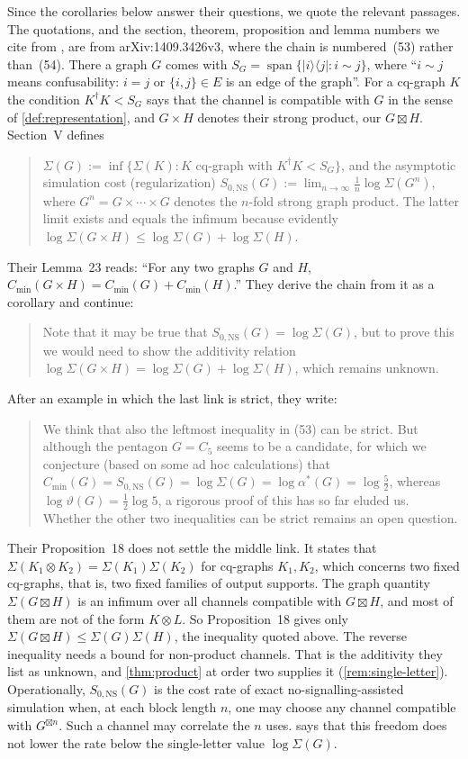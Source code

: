 \documentclass[11pt]{article}
\theoremstyle{definition}
\newcommand{\vt}{\vartheta}
\newcommand{\Cmin}{C_{\min}}
\newcommand{\SNS}{S_{0,\mathrm{NS}}}
\newcommand{\boxt}{\boxtimes}
\newcommand{\ket}[1]{\lvert #1\rangle}
\newcommand{\bra}[1]{\langle #1\rvert}
\begin{document}
Since the corollaries below answer their questions, we quote the relevant
passages.  The quotations, and the section, theorem, proposition and lemma
numbers we cite from \cite{DuanWinter2016}, are from arXiv:1409.3426v3,
where the chain is numbered~(53) rather than~(54).  There a
graph $G$ comes with $S_G=\operatorname{span}\{\ket i\!\bra j:i\sim j\}$,
where ``$i\sim j$ means confusability: $i=j$ or $\{i,j\}\in E$ is an edge of
the graph''.  For a cq-graph $K$ the condition $K^\dagger K<S_G$ says that
the channel is compatible with $G$ in the sense of \cref{def:representation},
and $G\times H$ denotes their strong product, our $G\boxt H$.  Section~V
defines
\begin{quote}\small
$\Sigma(G):=\inf\{\Sigma(K):K$ cq-graph with $K^\dagger K<S_G\}$, and the
asymptotic simulation cost (regularization)
$S_{0,\mathrm{NS}}(G):=\lim_{n\to\infty}\frac1n\log\Sigma(G^n)$, where
$G^n=G\times\cdots\times G$ denotes the $n$-fold strong graph product.  The
latter limit exists and equals the infimum because evidently
$\log\Sigma(G\times H)\le\log\Sigma(G)+\log\Sigma(H)$.
\end{quote}
Their Lemma~23 reads: ``For any two graphs $G$ and $H$,
$\Cmin(G\times H)=\Cmin(G)+\Cmin(H)$.''  They derive the chain from it as a
corollary and continue:
\begin{quote}\small
Note that it may be true that $S_{0,\mathrm{NS}}(G)=\log\Sigma(G)$, but to
prove this we would need to show the additivity relation
$\log\Sigma(G\times H)=\log\Sigma(G)+\log\Sigma(H)$, which remains unknown.
\end{quote}
After an example in which the last link is strict, they write:
\begin{quote}\small
We think that also the leftmost inequality in (53) can be strict.  But
although the pentagon $G=C_5$ seems to be a candidate, for which we
conjecture (based on some ad hoc calculations) that
$\Cmin(G)=S_{0,\mathrm{NS}}(G)=\log\Sigma(G)=\log\alpha^*(G)=\log\frac52$,
whereas $\log\vt(G)=\frac12\log5$, a rigorous proof of this has so far eluded
us.  Whether the other two inequalities can be strict remains an open
question.
\end{quote}

Their Proposition~18 does not settle the middle link.  It states that
$\Sigma(K_1\otimes K_2)=\Sigma(K_1)\Sigma(K_2)$ for cq-graphs $K_1,K_2$,
which concerns two fixed cq-graphs, that is, two fixed families of output
supports.  The graph quantity
$\Sigma(G\boxt H)$ is an infimum over all channels compatible with $G\boxt H$,
and most of them are not of the form $K\otimes L$.  So Proposition~18 gives
only $\Sigma(G\boxt H)\le\Sigma(G)\Sigma(H)$, the inequality quoted above.  The
reverse inequality needs a bound for non-product channels.  That is the
additivity they list as unknown, and \cref{thm:product} at order two supplies
it (\cref{rem:single-letter}).  Operationally, $\SNS(G)$ is the cost rate of
exact no-signalling-assisted simulation when, at each block length $n$, one
may choose any channel compatible with $G^{\boxt n}$.  Such a channel
may correlate the $n$ uses.   says that this freedom does not
lower the rate below the single-letter value $\log\Sigma(G)$.
\end{document}
